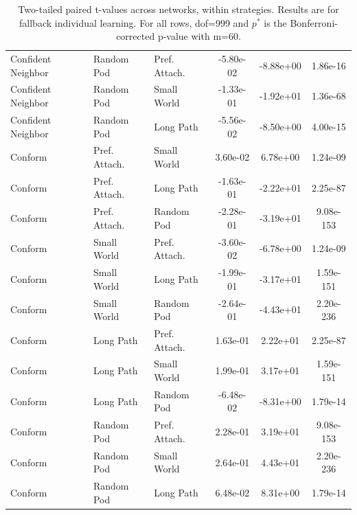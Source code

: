 \begin{table}[]
\begin{tabular}{l|ll|ccc}
Confident Neighbor&Random Pod&Pref. Attach.&-5.80e-02&-8.88e+00&1.86e-16\\
Confident Neighbor&Random Pod&Small World&-1.33e-01&-1.92e+01&1.36e-68\\
Confident Neighbor&Random Pod&Long Path&-5.56e-02&-8.50e+00&4.00e-15\\
\hline
Conform&Pref. Attach.&Small World&3.60e-02&6.78e+00&1.24e-09\\
Conform&Pref. Attach.&Long Path&-1.63e-01&-2.22e+01&2.25e-87\\
Conform&Pref. Attach.&Random Pod&-2.28e-01&-3.19e+01&9.08e-153\\
Conform&Small World&Pref. Attach.&-3.60e-02&-6.78e+00&1.24e-09\\
Conform&Small World&Long Path&-1.99e-01&-3.17e+01&1.59e-151\\
Conform&Small World&Random Pod&-2.64e-01&-4.43e+01&2.20e-236\\
Conform&Long Path&Pref. Attach.&1.63e-01&2.22e+01&2.25e-87\\
Conform&Long Path&Small World&1.99e-01&3.17e+01&1.59e-151\\
Conform&Long Path&Random Pod&-6.48e-02&-8.31e+00&1.79e-14\\
Conform&Random Pod&Pref. Attach.&2.28e-01&3.19e+01&9.08e-153\\
Conform&Random Pod&Small World&2.64e-01&4.43e+01&2.20e-236\\
Conform&Random Pod&Long Path&6.48e-02&8.31e+00&1.79e-14\\
\hline
    \end{tabular}
    \caption{Two-tailed paired t-values across networks, within strategies. Results are for fallback individual learning. For all rows, dof=999 and $p^*$ is the Bonferroni-corrected p-value with m=60.}
\end{table}

